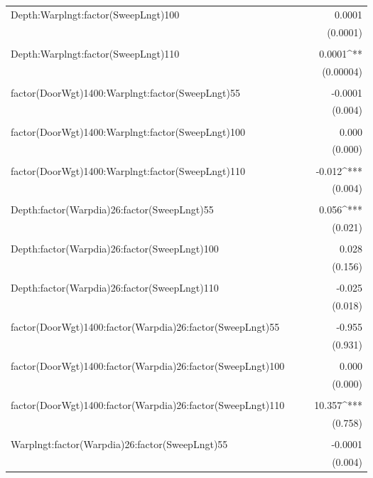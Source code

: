 \documentclass[12pt]{article}\usepackage[]{graphicx}\usepackage[]{color}
\begin{document}
\begin{table}[H]
\begin{tabular}{@{\extracolsep{5pt}}lD{.}{.}{-3} D{.}{.}{-3} D{.}{.}{-3} }
 Depth:Warplngt:factor(SweepLngt)100 &  &  & 0.0001 \\ 
  &  &  & (0.0001) \\ 
  & & & \\ 
 Depth:Warplngt:factor(SweepLngt)110 &  &  & 0.0001^{**} \\ 
  &  &  & (0.00004) \\ 
  & & & \\ 
 factor(DoorWgt)1400:Warplngt:factor(SweepLngt)55 &  &  & -0.0001 \\ 
  &  &  & (0.004) \\ 
  & & & \\ 
 factor(DoorWgt)1400:Warplngt:factor(SweepLngt)100 &  &  & 0.000 \\ 
  &  &  & (0.000) \\ 
  & & & \\ 
 factor(DoorWgt)1400:Warplngt:factor(SweepLngt)110 &  &  & -0.012^{***} \\ 
  &  &  & (0.004) \\ 
  & & & \\ 
 Depth:factor(Warpdia)26:factor(SweepLngt)55 &  &  & 0.056^{***} \\ 
  &  &  & (0.021) \\ 
  & & & \\ 
 Depth:factor(Warpdia)26:factor(SweepLngt)100 &  &  & 0.028 \\ 
  &  &  & (0.156) \\ 
  & & & \\ 
 Depth:factor(Warpdia)26:factor(SweepLngt)110 &  &  & -0.025 \\ 
  &  &  & (0.018) \\ 
  & & & \\ 
 factor(DoorWgt)1400:factor(Warpdia)26:factor(SweepLngt)55 &  &  & -0.955 \\ 
  &  &  & (0.931) \\ 
  & & & \\ 
 factor(DoorWgt)1400:factor(Warpdia)26:factor(SweepLngt)100 &  &  & 0.000 \\ 
  &  &  & (0.000) \\ 
  & & & \\ 
 factor(DoorWgt)1400:factor(Warpdia)26:factor(SweepLngt)110 &  &  & 10.357^{***} \\ 
  &  &  & (0.758) \\ 
  & & & \\ 
 Warplngt:factor(Warpdia)26:factor(SweepLngt)55 &  &  & -0.0001 \\ 
  &  &  & (0.004) \\ 

\end{tabular}
\end{table}
\end{document}
